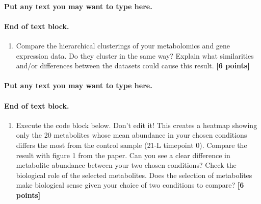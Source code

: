 \documentclass[
]{article}
\providecommand{\tightlist}{%
  \setlength{\itemsep}{0pt}\setlength{\parskip}{0pt}}
\begin{document}
\hypertarget{put-any-text-you-may-want-to-type-here.-22}{%
\paragraph{Put any text you may want to type
here.}\label{put-any-text-you-may-want-to-type-here.-22}}

\hypertarget{end-of-text-block.-24}{%
\paragraph{End of text block.}\label{end-of-text-block.-24}}

\begin{enumerate}
\def\labelenumi{\Alph{enumi})}
\setcounter{enumi}{2}
\tightlist
\item
  Compare the hierarchical clusterings of your metabolomics and gene
  expression data. Do they cluster in the same way? Explain what
  similarities and/or differences between the datasets could cause this
  result. \textbf{{[}6 points{]}}
\end{enumerate}

\hypertarget{put-any-text-you-may-want-to-type-here.-23}{%
\paragraph{Put any text you may want to type
here.}\label{put-any-text-you-may-want-to-type-here.-23}}

\hypertarget{end-of-text-block.-25}{%
\paragraph{End of text block.}\label{end-of-text-block.-25}}

\begin{enumerate}
\def\labelenumi{\Alph{enumi})}
\setcounter{enumi}{3}
\tightlist
\item
  Execute the code block below. Don't edit it! This creates a heatmap
  showing only the 20 metabolites whose mean abundance in your chosen
  conditions differs the most from the control sample (21-L timepoint
  0). Compare the result with figure 1 from the paper. Can you see a
  clear difference in metabolite abundance between your two chosen
  conditions? Check the biological role of the selected metabolites.
  Does the selection of metabolites make biological sense given your
  choice of two conditions to compare? \textbf{{[}6 points{]}}
\end{enumerate}
\end{document}
